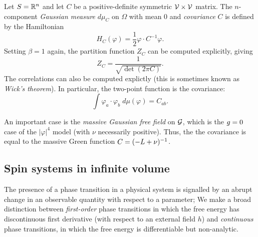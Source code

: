 

\begin{example}
Let $S = {\mathbb R}^n$ and let $C$ be a positive-definite symmetric $\mathcal{V}\times\mathcal{V}$
matrix. The $n$-component \emph{Gaussian measure} $d\mu_C$ on
$\Omega$ with mean $0$ and \emph{covariance} $C$ is defined by the Hamiltonian
\begin{equation}
H_C(\varphi) = \frac{1}{2} \varphi \cdot C^{-1} \varphi.
\end{equation}
Setting $\beta = 1$ again, the partition function $Z_C$ can be computed explicitly,
giving
\begin{equation}
Z_C
  =
\frac{1}{\sqrt{\det(2\pi C)}}.
\end{equation}
The correlations can also be computed explictly (this is sometimes known as
\emph{Wick's theorem}). In particular, the two-point function is the covariance:
\begin{equation}
\label{e:wick}
\int \varphi_a \cdot \varphi_b \; d\mu(\varphi) = C_{ab}.
\end{equation}

An important case is the \emph{massive Gaussian free field} on $\mathcal{G}$,
which is the $g = 0$ case of the $|\varphi|^4$ model (with $\nu$ necessarily positive).
Thus, the the covariance is equal to the massive Green function $C = (-L + \nu)^{-1}$.
\end{example}


\subsection{Spin systems in infinite volume}

The presence of a phase transition in a physical system is signalled by an abrupt
change in an observable quantity with respect to a parameter;
We make a broad distinction between
\emph{first-order} phase transitions in which the free energy has discontinuous first
derivative (with respect to an external field $h$) and \emph{continuous} phase transitions,
in which the free energy is differentiable but non-analytic.

